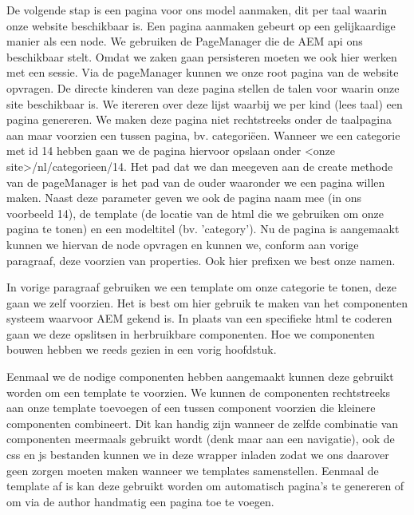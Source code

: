 \documentclass{article}
\begin{document}
	De volgende stap is een pagina voor ons model aanmaken, dit per taal waarin onze website beschikbaar is. Een pagina aanmaken gebeurt op een gelijkaardige manier als een node. We gebruiken de PageManager die de AEM api ons beschikbaar stelt. Omdat we zaken gaan persisteren moeten we ook hier werken met een sessie. Via de pageManager kunnen we onze root pagina van de website opvragen. De directe kinderen van deze pagina stellen de talen voor waarin onze site beschikbaar is. We itereren over deze lijst waarbij we per kind (lees taal) een pagina genereren. We maken deze pagina niet rechtstreeks onder de taalpagina aan maar voorzien een tussen pagina, bv. categoriëen. Wanneer we een categorie met id 14 hebben gaan we de pagina hiervoor opslaan onder <onze site>/nl/categorieen/14. Het pad dat we dan meegeven aan de create methode van de pageManager is het pad van de ouder waaronder we een pagina willen maken. Naast deze parameter geven we ook de pagina naam mee (in ons voorbeeld 14), de template (de locatie van de html die we gebruiken om onze pagina te tonen) en een modeltitel (bv. 'category'). Nu de pagina is aangemaakt kunnen we hiervan de node opvragen en kunnen we, conform aan vorige paragraaf, deze voorzien van properties. Ook hier prefixen we best onze namen.
    \par
    In vorige paragraaf gebruiken we een template om onze categorie te tonen, deze gaan we zelf voorzien. Het is best om hier gebruik te maken van het componenten systeem waarvoor AEM gekend is. In plaats van een specifieke html te coderen gaan we deze opslitsen in herbruikbare componenten. Hoe we componenten bouwen hebben we reeds gezien in een vorig hoofdstuk.
    \par
    Eenmaal we de nodige componenten hebben aangemaakt kunnen deze gebruikt worden om een template te voorzien. We kunnen de componenten rechtstreeks aan onze template toevoegen of een tussen component voorzien die kleinere componenten combineert. Dit kan handig zijn wanneer de zelfde combinatie van componenten meermaals gebruikt wordt (denk maar aan een navigatie), ook de css en js bestanden kunnen we in deze wrapper inladen zodat we ons daarover geen zorgen moeten maken wanneer we templates samenstellen. Eenmaal de template af is kan deze gebruikt worden om automatisch pagina's te genereren of om via de author handmatig een pagina toe te voegen.
\end{document}
